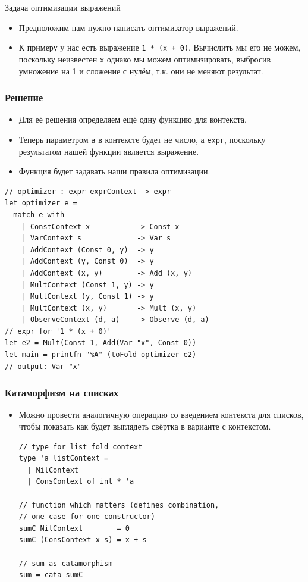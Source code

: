 \documentclass{beamer}
\begin{document}
\begin{frame}{Задача оптимизации выражений}

\begin{itemize}
\item
  Предположим нам нужно написать оптимизатор выражений.
\item
  К примеру у нас есть выражение \texttt{1 * (x + 0)}. Вычислить мы его
  не можем, поскольку неизвестен \texttt{x} однако мы можем
  оптимизировать, выбросив умножение на 1 и сложение с нулём, т.к. они
  не меняют результат.
\end{itemize}
\end{frame}

\begin{frame}[fragile]
\frametitle{Решение}

\begin{itemize}
\item
  Для её решения определяем ещё одну функцию для контекста.
\item
  Теперь параметром \texttt{a} в контексте будет не число, а
  \texttt{expr}, поскольку результатом нашей функции является выражение.
\item
  Функция будет задавать наши правила оптимизации.
\end{itemize}
\begin{lstlisting}
// optimizer : expr exprContext -> expr
let optimizer e =
  match e with  
    | ConstContext x           -> Const x
    | VarContext s             -> Var s
    | AddContext (Const 0, y)  -> y
    | AddContext (y, Const 0)  -> y
    | AddContext (x, y)        -> Add (x, y)
    | MultContext (Const 1, y) -> y
    | MultContext (y, Const 1) -> y
    | MultContext (x, y)       -> Mult (x, y)
    | ObserveContext (d, a)    -> Observe (d, a)
// expr for '1 * (x + 0)'
let e2 = Mult(Const 1, Add(Var "x", Const 0))
let main = printfn "%A" (toFold optimizer e2)
// output: Var "x"
\end{lstlisting}
\end{frame}

\begin{frame}[fragile]
\frametitle{Катаморфизм на списках}

\begin{itemize}
\item
  Можно провести аналогичную операцию со введением контекста для
  списков, чтобы показать как будет выглядеть свёртка в варианте с
  контекстом.

\begin{lstlisting}
// type for list fold context
type 'a listContext =
  | NilContext
  | ConsContext of int * 'a

// function which matters (defines combination,
// one case for one constructor)
sumC NilContext        = 0
sumC (ConsContext x s) = x + s

// sum as catamorphism
sum = cata sumC
\end{lstlisting}
\end{itemize}
\end{frame}
\end{document}
